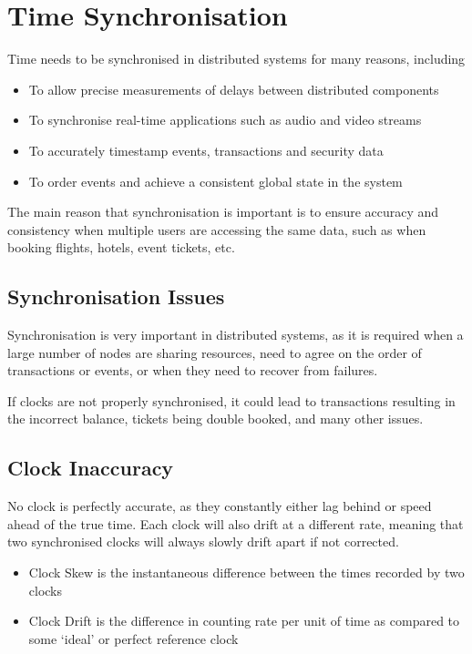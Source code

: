 
\section*{Time Synchronisation}

Time needs to be synchronised in distributed systems for many reasons, including
\begin{itemize}
  \item To allow precise measurements of delays between distributed components
  \item To synchronise real-time applications such as audio and video streams
  \item To accurately timestamp events, transactions and security data
  \item To order events and achieve a consistent global state in the system
\end{itemize}

The main reason that synchronisation is important is to ensure accuracy and consistency when multiple users are accessing the same data, such as when booking flights, hotels, event tickets, etc.

\subsection*{Synchronisation Issues}

Synchronisation is very important in distributed systems, as it is required when a large number of nodes are sharing resources, need to agree on the order of transactions or events, or when they need to recover from failures.

If clocks are not properly synchronised, it could lead to transactions resulting in the incorrect balance, tickets being double booked, and many other issues.

\subsection*{Clock Inaccuracy}

No clock is perfectly accurate, as they constantly either lag behind or speed ahead of the true time. Each clock will also drift at a different rate, meaning that two synchronised clocks will always slowly drift apart if not corrected.

\begin{itemize}
  \item Clock Skew is the instantaneous difference between the times recorded by two clocks
  \item Clock Drift is the difference in counting rate per unit of time as compared to some `ideal' or perfect reference clock
\end{itemize}

